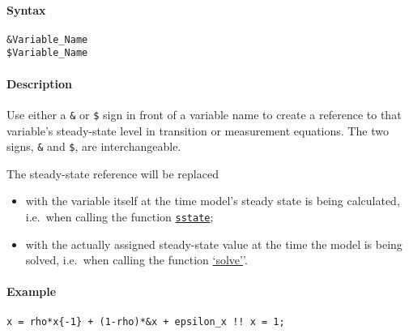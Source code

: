


	\paragraph{Syntax}\label{syntax}

\begin{verbatim}
&Variable_Name
$Variable_Name
\end{verbatim}

\paragraph{Description}\label{description}

Use either a \texttt{\&} or \texttt{\$} sign in front of a variable name
to create a reference to that variable's steady-state level in
transition or measurement equations. The two signs, \texttt{\&} and
\texttt{\$}, are interchangeable.

The steady-state reference will be replaced

\begin{itemize}
\item
  with the variable itself at the time model's steady state is being
  calculated, i.e.~when calling the function
  \href{model/sstate}{\texttt{sstate}};
\item
  with the actually assigned steady-state value at the time the model is
  being solved, i.e.~when calling the function
  \href{model/solve}{`solve'}'.
\end{itemize}

\paragraph{Example}\label{example}

\begin{verbatim}
x = rho*x{-1} + (1-rho)*&x + epsilon_x !! x = 1;
\end{verbatim}


